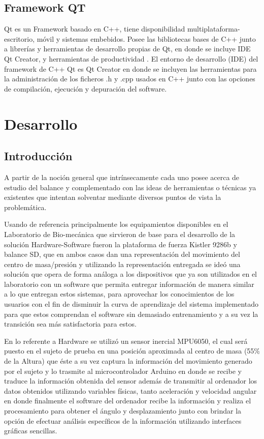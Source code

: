 \documentclass[12pt,a4paper]{article}
\begin{document}
\subsection{Framework QT}
Qt\cite{QT} es un Framework basado en C++, tiene disponibilidad multiplataforma- escritorio, móvil y sistemas embebidos.
Posee las bibliotecas bases de C++  junto a librerías y herramientas de desarrollo propias de Qt, en donde se incluye IDE Qt Creator, y herramientas de productividad .
El entorno de desarrollo (IDE) del framework de C++ Qt  es Qt Creator en donde se incluyen las herramientas para la administración de los ficheros .h y .cpp usados en C++ junto con las opciones de compilación, ejecución y depuración del software.


\section{Desarrollo}
\subsection{Introducción}

A partir de la noción general que intrínsecamente cada uno posee acerca de estudio del balance y complementado con las ideas de herramientas o técnicas ya existentes que intentan solventar mediante diversos puntos de vista la problemática.

Usando de referencia principalmente los equipamientos disponibles en el Laboratorio de Bio-mecánica que sirvieron de base para el desarrollo de la solución Hardware-Software fueron la plataforma de fuerza Kistler 9286b \cite{KISTLER} y balance SD, que en ambos casos dan una representación del movimiento del centro de masa/presión y utilizando la representación entregada se ideó una solución que opera de forma análoga a los dispositivos que ya son utilizados en el laboratorio con un software que permita entregar información de manera similar a lo que entregan estos sistemas, para aprovechar los conocimientos de los usuarios con el fin de disminuir la curva de aprendizaje del sistema implementado para que estos comprendan el software sin demasiado entrenamiento y a su vez la transición sea más satisfactoria para estos.

En lo referente a Hardware se utilizó un sensor inercial MPU6050, el cual será puesto en el sujeto de prueba en una posición aproximada al centro de masa (55\% de la Altura) que éste a su vez captura la información del movimiento generado por el sujeto y lo trasmite al microcontrolador Arduino en donde se recibe y traduce la información obtenida del sensor además de transmitir al ordenador los datos obtenidos utilizando variables físicas, tanto aceleración y velocidad angular en donde finalmente el software del ordenador recibe la información y realiza el procesamiento para obtener el ángulo y desplazamiento junto con brindar la opción de efectuar análisis específicos de la información utilizando interfaces gráficas sencillas.
\end{document}
